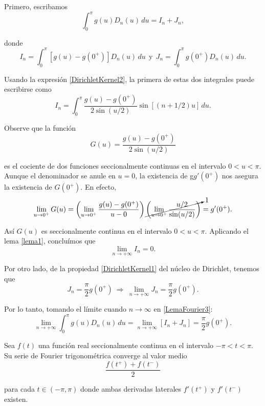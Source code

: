 \begin{demo}
Primero, escribamos 
\begin{equation}
    \int_0^{\pi} g(u) D_n(u) \,du = I_n + J_n, \label{LemaFourier3}
\end{equation}

donde 
$$I_n = \int_0^{\pi} [g(u) - g(0^+)] D_n(u) \,du ~~\mbox{y}~~ J_n = \int_0^{\pi} g(0^+) D_n(u) \,du.$$

Usando la expresión \eqref{DirichletKernel2}, la primera de estas dos integrales puede escribirse como 
\begin{equation}
   I_n = \int_0^{\pi} \frac{g(u) - g(0^+)}{2 \sin(u/2)} \sin [(n+1/2)u] \,du. \label{LemaFourier4}
\end{equation}

Observe que la función
$$G(u) =  \frac{g(u) - g(0^+)}{2 \sin(u/2)}$$

es el cociente de dos funciones seccionalmente continuas en el intervalo $0 < u <\pi$. Aunque el denominador se anule en $u = 0$, la existencia de g$g'(0^+)$ nos asegura la existencia de $G(0^+)$. En efecto,
$$\lim_{u \to 0^+} G(u) = \left( \lim_{u \to 0^+} \frac{g(u) - g(0^+)}{u-0} \right) \cancelto{1}{\left(\lim_{u \to 0^+} \frac{u/2}{\sin(u/2)}\right)}= g'(0^+).$$

Así $G(u)$ es seccionalmente continua en el intervalo $0<u<\pi$. Aplicando el lema \ref{lema1}, concluímos que
$$\lim_{n \to + \infty} I_n = 0.$$

Por otro lado, de la propiedad \eqref{DirichletKernel1} del núcleo de Dirichlet, tenemos que 
$$J_n = \frac{\pi}{2} g(0^+) ~\Rightarrow~ \lim_{n \to + \infty}J_n = \frac{\pi}{2} g(0^+).$$

Por lo tanto, tomando el límite cuando $n \to \infty$ en \eqref{LemaFourier3}:
$$\lim_{n \to + \infty}  \int_0^{\pi} g(u) D_n(u) \,du = \lim_{n \to + \infty} [I_n + J_n] = \frac{\pi}{2} g(0^+).$$
\end{demo}

\begin{teorema} 
Sea $f(t)$ una función real seccionalmente continua en el intervalo $-\pi < t < \pi$. Su serie de Fourier trigonométrica converge al valor medio
\vspace{-0.05cm}
$$\frac{f(t^+) + f(t^-)}{2}$$

para cada $t \in (-\pi,\pi)$ donde ambas derivadas laterales $f'(t^+)$ y $f'(t^-)$ existen.
\end{teorema}

